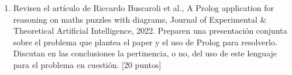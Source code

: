 \begin{enumerate}
    \item Revisen el artículo de Riccardo Buscaroli et al., A Prolog application for reasoning on maths puzzles with diagrams, Journal of Experimental \& Theoretical Artificial Intelligence, 2022. Preparen una presentación conjunta sobre el problema que plantea el paper y el uso de Prolog para resolverlo. Discutan en las conclusiones la pertinencia, o no, del uso de este lenguaje para el problema en cuestión. [20 puntos]
\end{enumerate}







